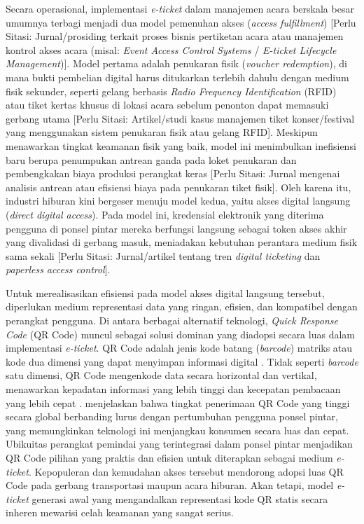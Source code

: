 Secara operasional, implementasi \textit{e-ticket} dalam manajemen acara berskala besar umumnya terbagi menjadi dua model pemenuhan akses (\textit{access fulfillment}) [Perlu Sitasi: Jurnal/prosiding terkait proses bisnis pertiketan acara atau manajemen kontrol akses acara (misal: \textit{Event Access Control Systems} / \textit{E-ticket Lifecycle Management})]. Model pertama adalah penukaran fisik (\textit{voucher redemption}), di mana bukti pembelian digital harus ditukarkan terlebih dahulu dengan medium fisik sekunder, seperti gelang berbasis \textit{Radio Frequency Identification} (RFID) atau tiket kertas khusus di lokasi acara sebelum penonton dapat memasuki gerbang utama [Perlu Sitasi: Artikel/studi kasus manajemen tiket konser/festival yang menggunakan sistem penukaran fisik atau gelang RFID]. Meskipun menawarkan tingkat keamanan fisik yang baik, model ini menimbulkan inefisiensi baru berupa penumpukan antrean ganda pada loket penukaran dan pembengkakan biaya produksi perangkat keras [Perlu Sitasi: Jurnal mengenai analisis antrean atau efisiensi biaya pada penukaran tiket fisik]. Oleh karena itu, industri hiburan kini bergeser menuju model kedua, yaitu akses digital langsung (\textit{direct digital access}). Pada model ini, kredensial elektronik yang diterima pengguna di ponsel pintar mereka berfungsi langsung sebagai token akses akhir yang divalidasi di gerbang masuk, meniadakan kebutuhan perantara medium fisik sama sekali [Perlu Sitasi: Jurnal/artikel tentang tren \textit{digital ticketing} dan \textit{paperless access control}].

Untuk merealisasikan efisiensi pada model akses digital langsung tersebut, diperlukan medium representasi data yang ringan, efisien, dan kompatibel dengan perangkat pengguna. Di antara berbagai alternatif teknologi, \textit{Quick Response Code} (QR Code) muncul sebagai solusi dominan yang diadopsi secara luas dalam implementasi \textit{e-ticket}. QR Code adalah jenis kode batang (\textit{barcode}) matriks atau kode dua dimensi yang dapat menyimpan informasi digital \cite{shin2012psychology}. Tidak seperti \textit{barcode} satu dimensi, QR Code mengenkode data secara horizontal dan vertikal, menawarkan kepadatan informasi yang lebih tinggi dan kecepatan pembacaan yang lebih cepat \cite{alsuhibany2025innovative}. \textcite{tiwari2016introduction} menjelaskan bahwa tingkat penerimaan QR Code yang tinggi secara global berbanding lurus dengan pertumbuhan pengguna ponsel pintar, yang memungkinkan teknologi ini menjangkau konsumen secara luas dan cepat. Ubikuitas perangkat pemindai yang terintegrasi dalam ponsel pintar menjadikan QR Code pilihan yang praktis dan efisien untuk diterapkan sebagai medium \textit{e-ticket}. Kepopuleran dan kemudahan akses tersebut mendorong adopsi luas QR Code pada gerbang transportasi maupun acara hiburan. Akan tetapi, model \textit{e-ticket} generasi awal yang mengandalkan representasi kode QR statis secara inheren mewarisi celah keamanan yang sangat serius.


